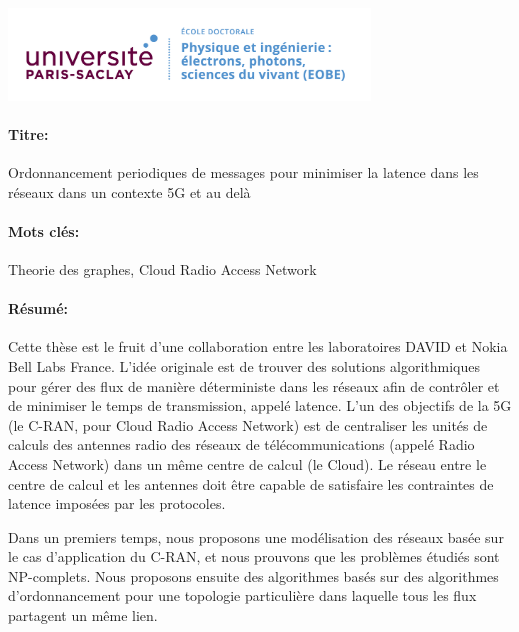 \noindent 
\includegraphics[height=2.45cm]{EOBE}
\vspace{1cm}
\begin{mdframed}[linecolor=Prune,linewidth=1]
\vspace{-.25cm}
\paragraph*{Titre:} Ordonnancement periodiques de messages pour minimiser la latence dans les réseaux dans un contexte 5G et au delà

\begin{small}
\vspace{-.25cm}
\paragraph*{Mots clés:} Theorie des graphes, Cloud Radio Access Network

\vspace{-.5cm}
\begin{multicols}{2}
\paragraph*{Résumé:} Cette thèse est le fruit d’une collaboration entre les laboratoires DAVID et Nokia Bell Labs France.
L’idée originale est de trouver des solutions algorithmiques pour gérer des flux de manière déterministe dans les réseaux afin de contrôler et de minimiser le temps de transmission, appelé latence. L’un des objectifs de la 5G (le C-RAN, pour Cloud Radio Access Network) est de centraliser les unités de calculs des antennes radio des réseaux de télécommunications (appelé Radio Access Network) dans un même centre de calcul (le Cloud). Le réseau entre le centre de calcul et les antennes doit être capable de satisfaire les contraintes de latence imposées par les protocoles.

Dans un premiers temps, nous proposons une modélisation des réseaux basée sur le cas d’application du C-RAN, et nous prouvons que les problèmes étudiés sont NP-complets. Nous proposons ensuite des algorithmes basés sur des algorithmes d’ordonnancement pour une topologie particulière dans laquelle tous les flux partagent un même lien. 


\end{multicols}
\end{small}
\end{mdframed}
